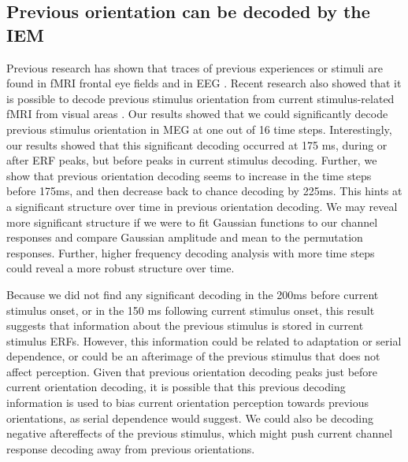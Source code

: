 \documentclass[../main.tex]{subfiles}
\begin{document}
\subsection{Previous orientation can be decoded by the IEM}
Previous research has shown that traces of previous experiences or stimuli are found in fMRI frontal eye fields \citep{Papadimitriou} and in EEG \citep{BaeLuck}. Recent research also showed that it is possible to decode previous stimulus orientation from current stimulus-related fMRI from visual areas \citep{Sheehan2021.04.06.438664}. Our results showed that we could significantly decode previous stimulus orientation in MEG at one out of 16 time steps. Interestingly, our results showed that this significant decoding occurred at 175 ms, during or after ERF peaks, but before peaks in current stimulus decoding. Further, we show that previous orientation decoding seems to increase in the time steps before 175ms, and then decrease back to chance decoding by 225ms. This hints at a significant structure over time in previous orientation decoding. We may reveal more significant structure if we were to fit Gaussian functions to our channel responses and compare Gaussian amplitude and mean to the permutation responses. Further, higher frequency decoding analysis with more time steps could reveal a more robust structure over time.

Because we did not find any significant decoding in the 200ms before current stimulus onset, or in the 150 ms following current stimulus onset, this result suggests that information about the previous stimulus is stored in current stimulus ERFs. However, this information could be related to adaptation or serial dependence, or could be an afterimage of the previous stimulus that does not affect perception. Given that previous orientation decoding peaks just before current orientation decoding, it is possible that this previous decoding information is used to bias current orientation perception towards previous orientations, as serial dependence would suggest. We could also be decoding negative aftereffects of the previous stimulus, which might push current channel response decoding away from previous orientations.
\end{document}
